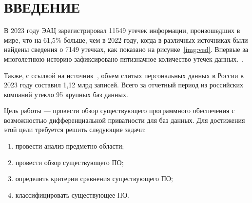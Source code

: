 \chapter*{ВВЕДЕНИЕ}
В 2023 году ЭАЦ зарегистрировал 11549 утечек информации, произошедших в мире, что
на 61,5\% больше, чем в 2022 году, когда в различных источниках были найдены
сведения о 7149 утечках, как показано на рисунке~\ref{img:ved}. Впервые за многолетнюю историю зафиксировано пятизначное количество утечек данных.~\cite{utechki}.

Также, с ссылкой на источник~\cite{forbes}, объем слитых персональных данных в России в 2023 году составил 1,12 млрд записей. Всего за отчетный период из российских компаний утекло 95 крупных баз данных.
 
 

Цель работы --- провести обзор существующего программного обеспечения с возможностью
дифференциальной приватности для баз данных.
Для достижения этой цели требуется решить следующие задачи:
\begin{enumerate}[label*=---]
	\item провести анализ предметно области; 
	\item провести обзор существующего ПО;
	\item определить критерии сравнения существующего ПО;
	\item классифицировать существующее ПО.
\end{enumerate}